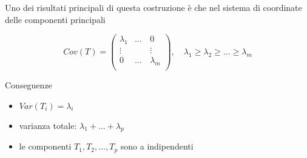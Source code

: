 \documentclass[
  11pt,
]{book}
\providecommand{\tightlist}{%
  \setlength{\itemsep}{0pt}\setlength{\parskip}{0pt}}
\begin{document}
Uno dei risultati principali di questa costruzione è che nel sistema di coordinate delle componenti principali

\begin{equation}\label{eq:Corr_diag}
Cov(T)=\left(
\begin{array}{cccc}
\lambda_1  & \dots & 0 \\
\vdots & \quad & \vdots \\
0 & \dots & \lambda_m \\
\end{array}
\right),
\quad \lambda_1 \geq \lambda_2 \geq \dots \geq \lambda_m
\end{equation}

Conseguenze

\begin{itemize}
\tightlist
\item
  \(Var(T_i)=\lambda_i\)\\
\item
  varianza totale: \(\lambda_1+\dots+\lambda_p\)\\
\item
  le componenti \(T_1,T_2,\dots,T_p\) sono a indipendenti
\end{itemize}

  

\end{document}
